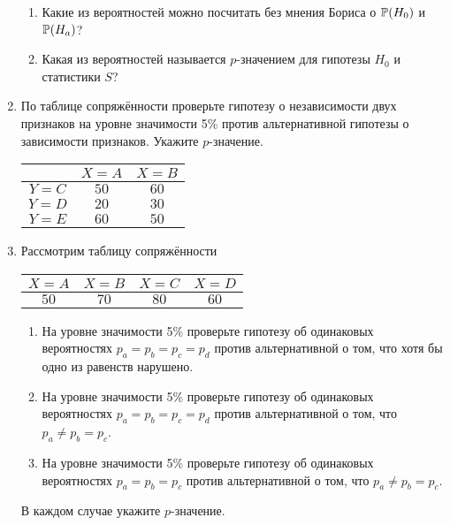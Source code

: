 \begin{enumerate}[resume]
    \begin{enumerate}[resume]
      \item Какие из вероятностей можно посчитать без мнения Бориса о $\P(H_0)$ и $\P(H_a)$?
      \item Какая из вероятностей называется $p$-значением для гипотезы $H_0$ и статистики $S$?
    \end{enumerate}
    
    
    \item По таблице сопряжённости проверьте гипотезу о независимости двух признаков на уровне значимости 5\%
    против альтернативной гипотезы о зависимости признаков. Укажите $p$-значение.
    
    \begin{tabular}{*{3}{c}}
        \toprule
         & $X = A$ & $X = B$ \\
        \midrule
        $Y = C$ & $50$ & $60$ \\
        $Y = D$ & $20$ & $30$ \\
        $Y = E$ & $60$ & $50$ \\
        \bottomrule
    \end{tabular}
        
    \item Рассмотрим таблицу сопряжённости
    
    \begin{tabular}{*{4}{c}}
        \toprule
        $X = A$ & $X = B$ & $X = C$ & $X = D$ \\
        \midrule
        $50$ & $70$ & $80$ & $60$ \\
        \bottomrule
    \end{tabular}
    
    \begin{enumerate}
        \item На уровне значимости 5\% проверьте гипотезу об одинаковых вероятностях $p_a = p_b = p_c = p_d$ против альтернативной о том, что хотя бы одно из равенств нарушено.
        \item На уровне значимости 5\% проверьте гипотезу об одинаковых вероятностях $p_a = p_b = p_c = p_d$ против альтернативной о том, что $p_a \neq p_b = p_c$.
        \item На уровне значимости 5\% проверьте гипотезу об одинаковых вероятностях $p_a = p_b = p_c$ против альтернативной о том, что $p_a \neq p_b = p_c$.
    \end{enumerate}

    В каждом случае укажите $p$-значение.
\end{enumerate}

